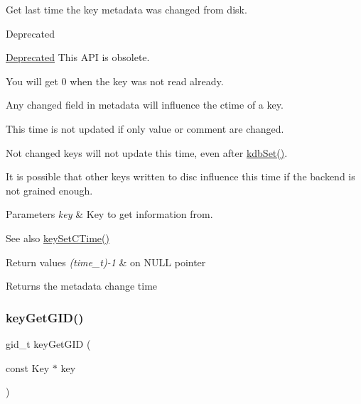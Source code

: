 Get last time the key metadata was changed from disk. 

\begin{DoxyRefDesc}{Deprecated}
\item[\hyperlink{deprecated__deprecated000025}{Deprecated}]This A\+PI is obsolete.\end{DoxyRefDesc}


You will get 0 when the key was not read already.

Any changed field in metadata will influence the ctime of a key.

This time is not updated if only value or comment are changed.

Not changed keys will not update this time, even after \hyperlink{group__kdb_ga11436b058408f83d303ca5e996832bcf}{kdb\+Set()}.

It is possible that other keys written to disc influence this time if the backend is not grained enough.


\begin{DoxyParams}{Parameters}
{\em key} & Key to get information from. \\
\hline
\end{DoxyParams}
\begin{DoxySeeAlso}{See also}
\hyperlink{group__meta_ga9f502ecab8ab43f0b17220fcc95f3fa5}{key\+Set\+C\+Time()} 
\end{DoxySeeAlso}

\begin{DoxyRetVals}{Return values}
{\em (time\+\_\+t)-\/1} & on N\+U\+LL pointer \\
\hline
\end{DoxyRetVals}
\begin{DoxyReturn}{Returns}
the metadata change time 
\end{DoxyReturn}
\mbox{\label{group__meta_ga46a95e81d7d7f4e3eb59e60e5f3738c0}} 
\subsubsection{\texorpdfstring{key\+Get\+G\+I\+D()}{keyGetGID()}}
{\footnotesize\ttfamily gid\+\_\+t key\+Get\+G\+ID (\begin{DoxyParamCaption}\item[{const Key $\ast$}]{key }\end{DoxyParamCaption})}



